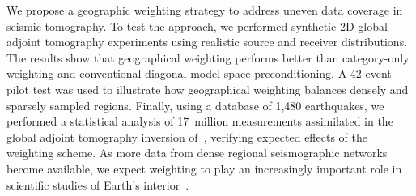 We propose a geographic weighting strategy to address uneven data coverage in seismic tomography.  %
To test the approach, we performed synthetic 2D global adjoint tomography experiments using realistic source and receiver distributions.  
The results show that geographical weighting performs better than category-only weighting and conventional diagonal model-space preconditioning. %
A 42-event pilot test was used to illustrate how  
geographical weighting balances densely and sparsely sampled regions.  
Finally,
using a database of 1,480 earthquakes, we performed a statistical analysis of 17~million measurements assimilated in the global adjoint tomography inversion of~\cite{Lei2018}, verifying expected effects of the weighting scheme. 
As more data from dense regional seismographic networks become available, we expect weighting to play an increasingly important role in scientific studies of Earth's interior~\cite{Orsvuran2019}.    
